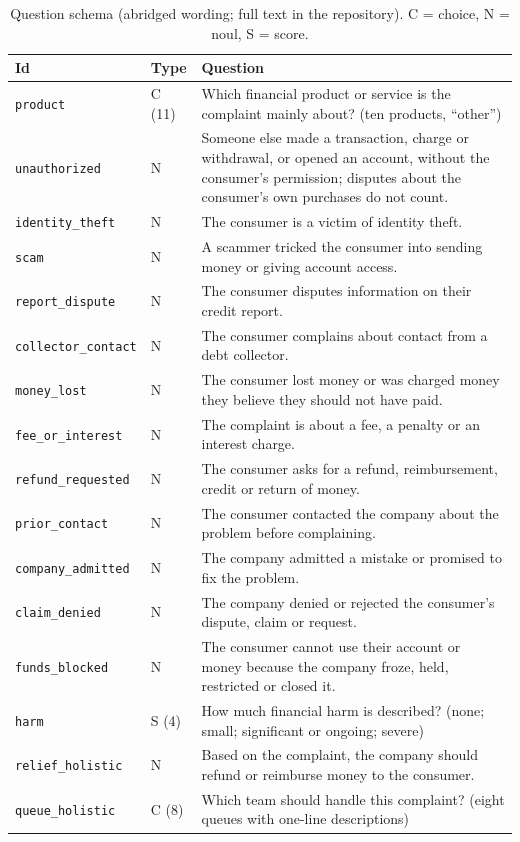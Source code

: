 \documentclass[a4paper,fleqn]{cas-sc}
\theoremstyle{definition}
\newcommand{\feel}[1]{\texttt{#1}}
\begin{document}
\begin{table}[pos=tbp]
  \centering
  \caption{Question schema (abridged wording; full text in the repository). C = choice, N = noul, S = score.}
  \label{tab:schema}
  \footnotesize
  \begin{tabular}{@{}llp{11.6cm}@{}}
    \toprule
    Id & Type & Question \\
    \midrule
    \feel{product} & C (11) & Which financial product or service is the complaint mainly about? (ten products, ``other'') \\
    \feel{unauthorized} & N & Someone else made a transaction, charge or withdrawal, or opened an account, without the consumer's permission; disputes about the consumer's own purchases do not count. \\
    \feel{identity\_theft} & N & The consumer is a victim of identity theft. \\
    \feel{scam} & N & A scammer tricked the consumer into sending money or giving account access. \\
    \feel{report\_dispute} & N & The consumer disputes information on their credit report. \\
    \feel{collector\_contact} & N & The consumer complains about contact from a debt collector. \\
    \feel{money\_lost} & N & The consumer lost money or was charged money they believe they should not have paid. \\
    \feel{fee\_or\_interest} & N & The complaint is about a fee, a penalty or an interest charge. \\
    \feel{refund\_requested} & N & The consumer asks for a refund, reimbursement, credit or return of money. \\
    \feel{prior\_contact} & N & The consumer contacted the company about the problem before complaining. \\
    \feel{company\_admitted} & N & The company admitted a mistake or promised to fix the problem. \\
    \feel{claim\_denied} & N & The company denied or rejected the consumer's dispute, claim or request. \\
    \feel{funds\_blocked} & N & The consumer cannot use their account or money because the company froze, held, restricted or closed it. \\
    \feel{harm} & S (4) & How much financial harm is described? (none; small; significant or ongoing; severe) \\
    \midrule
    \feel{relief\_holistic} & N & Based on the complaint, the company should refund or reimburse money to the consumer. \\
    \feel{queue\_holistic} & C (8) & Which team should handle this complaint? (eight queues with one-line descriptions) \\
    \bottomrule
  \end{tabular}
\end{table}
\end{document}
